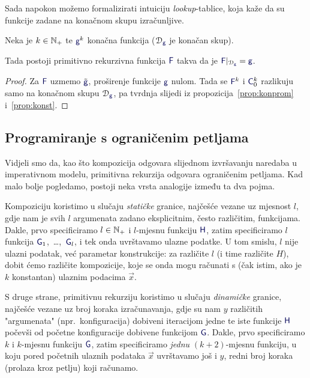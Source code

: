 Sada napokon možemo formalizirati intuiciju \emph{lookup}-tablice, koja kaže da su funkcije zadane na konačnom skupu izračunljive. %

\begin{korolar}[{name=[konačne funkcije su proširive do primitivno rekurzivnih]}]\label{kor:kon0}
Neka je $k\in{\mathbb N}_+$ te $\f g^k$ konačna funkcija ($\dom{\f g}$ je konačan skup).
   
    Tada postoji primitivno rekurzivna funkcija $\f F$ takva da je $\f F|_{\dom{\f g}}=\f g$.
\end{korolar}
\begin{proof}
    Za $\f F$ uzmemo $\tilde{\f g}$, proširenje funkcije $\f g$ nulom. Tada se $\f F^k$ i $\f C_0^k$ razlikuju samo na konačnom skupu $\dom{\f g}$, pa tvrdnja slijedi iz propozicija~\ref{prop:konprom} i~\ref{prop:konst}. 
\end{proof}

\subsection{Programiranje s ograničenim petljama}\label{sec:ogrprog}

Vidjeli smo da, kao što kompozicija odgovara slijednom izvršavanju naredaba u imperativnom modelu, primitivna rekurzija odgovara ograničenim petljama. Kad malo bolje pogledamo, postoji neka vrsta analogije između ta dva pojma.

Kompoziciju koristimo u slučaju \emph{statičke} granice, najčešće vezane uz mjesnost $l$, gdje nam je svih $l$ argumenata zadano eksplicitnim, često različitim, funkcijama. Dakle, prvo specificiramo $l\in{\mathbb N}_+$ i $l$-mjesnu funkciju $\f H$, zatim specificiramo $l$ funkcija $\f G_1$,~\ldots,~$\f G_l$, i tek onda uvrštavamo ulazne podatke. U tom smislu, $l$ nije ulazni podatak, već parametar konstrukcije: za različite $l$ (i time različite $H$), dobit ćemo različite kompozicije, koje se onda mogu računati s (čak istim, ako je $k$ konstantan) ulaznim podacima $\vec x$.

S druge strane, primitivnu rekurziju koristimo u slučaju \emph{dinamičke} granice, naj\-češ\-će vezane uz broj koraka izračunavanja, gdje su nam $y$ različitih "argumenata" (npr.\ konfiguracija) dobiveni iteracijom jedne te iste funkcije $\f H$ počevši od početne konfiguracije dobivene funkcijom $\f G$. Dakle, prvo specificiramo $k$ i $k$-mjesnu funkciju $\f G$, zatim specificiramo \emph{jednu} $(k+2)$-mjesnu funkciju, u koju pored početnih ulaznih podataka $\vec x$ uvrštavamo još i $y$, redni broj koraka (prolaza kroz petlju) koji računamo.


